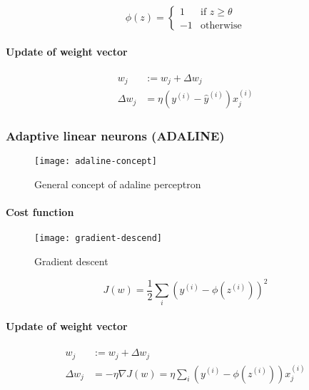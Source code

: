 \documentclass{article}
\begin{document}
			\begin{equation*}
				\phi(z) = \begin{cases}
					1 &\mbox{if } z \geq \theta \\
					-1 &\mbox{otherwise}
				\end{cases}
			\end{equation*}

			\paragraph{Update of weight vector}

			\begin{align*}
					w_j &:= w_j + \Delta w_j \\
					\Delta w_j &= \eta(y^{(i)} - \hat{y}^{(i)}) x^{(i)}_j
			\end{align*}

			\subsubsection{Adaptive linear neurons (ADALINE)}

			\begin{figure}
				\centering
				\texttt{[image: adaline-concept]}
				\caption{General concept of adaline perceptron}
				\label{fig:adaline-concept}
			\end{figure}

			\paragraph{Cost function}

			\begin{figure}
				\centering
				\texttt{[image: gradient-descend]}
				\caption{Gradient descent}
				\label{fig:gradient-descend}
			\end{figure}

			\begin{equation*}
				J(w) = \frac{1}{2} \sum_i (y^{(i)}-\phi(z^{(i)}))^2
			\end{equation*}

			\paragraph{Update of weight vector}

			\begin{align*}
					w_j &:= w_j + \Delta w_j \\
					\Delta w_j &= -\eta\nabla J(w) = \eta\sum_i (y^{(i)} -\phi(z^{(i)}))x^{(i)}_j
			\end{align*}
\end{document}
